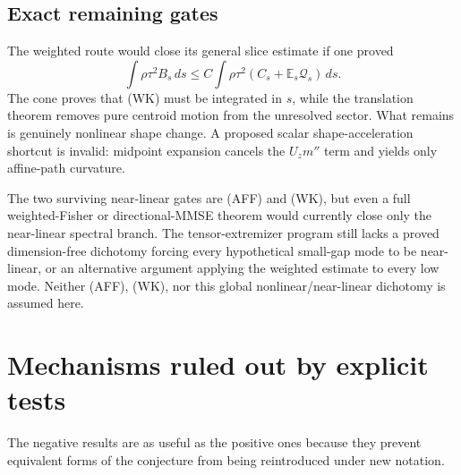 \documentclass[11pt]{article}
\theoremstyle{definition}
\theoremstyle{remark}
\newcommand{\E}{\mathbb E}
\newcommand{\1}{\mathbf 1}
\begin{document}
\subsection{Exact remaining gates}

The weighted route would close its general slice estimate if one proved
\[
 \boxed{\qquad
 \int\rho\tau^2B_s\,ds
 \le C\int\rho\tau^2(C_s+\E_s\mathcal Q_s)\,ds.
 \qquad}                                              \tag{WK}
\]
The cone proves that (WK) must be integrated in \(s\), while the
translation theorem removes pure centroid motion from the unresolved
sector.  What remains is genuinely nonlinear shape change.  A proposed
scalar shape-acceleration shortcut is invalid: midpoint expansion cancels
the \(U_zm''\) term and yields only affine-path curvature.

The two surviving near-linear gates are (AFF) and (WK), but even a full
weighted-Fisher or directional-MMSE theorem would currently close only the
near-linear spectral branch.  The tensor-extremizer program still lacks a
proved dimension-free dichotomy forcing every hypothetical small-gap mode
to be near-linear, or an alternative argument applying the weighted
estimate to every low mode.  Neither (AFF), (WK), nor this global
nonlinear/near-linear dichotomy is assumed here.

\section{Mechanisms ruled out by explicit tests}

The negative results are as useful as the positive ones because they
prevent equivalent forms of the conjecture from being reintroduced under
new notation.
\end{document}
